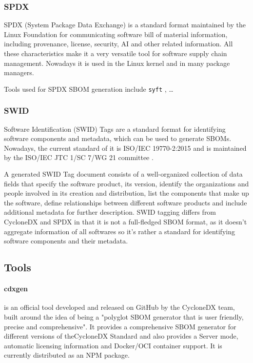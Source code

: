 \subsubsection{SPDX} \label{dataset:standard:spdx}

SPDX (System Package Data Exchange) \cite{standards:sbom:spdx} is a standard format maintained by the Linux Foundation for communicating software bill of material information, including provenance, license, security, AI and other related information.
All these characteristics make it a very versatile tool for software supply chain management. Nowadays it is used in the Linux kernel and in many package managers.

Tools used for SPDX SBOM generation include \verb|syft| \cite{repository:cyclonedx:syft}, \dots

\subsubsection{SWID} \label{dataset:standard:swid}

Software Identification (SWID) Tags \cite{standards:sbom:swid} are a standard format for identifying software components and metadata, which can be used to generate SBOMs. Nowadays, the current standard of it is ISO/IEC 19770-2:2015 \cite{standards:swid:iso19770-2:2015} and is maintained by the ISO/IEC JTC 1/SC 7/WG 21 committee \cite{standards:swid:committee}.

A generated SWID Tag document consists of a well-organized collection of data fields that specify the software product, its version, identify the organizations and people involved in its creation and distribution, list the components that make up the software, define relationships between different software products and include additional metadata for further description.
SWID tagging differs from CycloneDX and SPDX in that it is not a full-fledged SBOM format, as it doesn't aggregate information of all softwares so it's rather a standard for identifying software components and their metadata.


\subsection{Tools} \label{dataset:tools}

\paragraph{cdxgen} is an official tool developed and released on GitHub by the CycloneDX team, built around the idea of being a "polyglot SBOM generator that is user friendly, precise and comprehensive". It provides a comprehensive SBOM generator for different versions of theCycloneDX Standard and also provides a Server mode, automatic licensing information and Docker/OCI container support. It is currently distributed as an NPM package.


